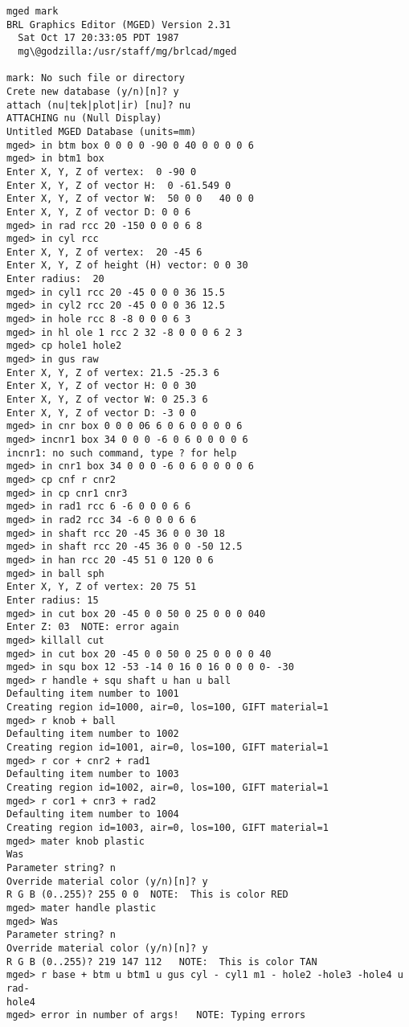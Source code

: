 \begin{verbatim}
mged mark
BRL Graphics Editor (MGED) Version 2.31
  Sat Oct 17 20:33:05 PDT 1987
  mg\@godzilla:/usr/staff/mg/brlcad/mged

mark: No such file or directory
Crete new database (y/n)[n]? y
attach (nu|tek|plot|ir) [nu]? nu
ATTACHING nu (Null Display)
Untitled MGED Database (units=mm)
mged> in btm box 0 0 0 0 -90 0 40 0 0 0 0 6
mged> in btm1 box
Enter X, Y, Z of vertex:  0 -90 0
Enter X, Y, Z of vector H:  0 -61.549 0
Enter X, Y, Z of vector W:  50 0 0   40 0 0
Enter X, Y, Z of vector D: 0 0 6
mged> in rad rcc 20 -150 0 0 0 6 8
mged> in cyl rcc
Enter X, Y, Z of vertex:  20 -45 6
Enter X, Y, Z of height (H) vector: 0 0 30
Enter radius:  20
mged> in cyl1 rcc 20 -45 0 0 0 36 15.5
mged> in cyl2 rcc 20 -45 0 0 0 36 12.5
mged> in hole rcc 8 -8 0 0 0 6 3
mged> in hl ole 1 rcc 2 32 -8 0 0 0 6 2 3
mged> cp hole1 hole2
mged> in gus raw
Enter X, Y, Z of vertex: 21.5 -25.3 6
Enter X, Y, Z of vector H: 0 0 30
Enter X, Y, Z of vector W: 0 25.3 6
Enter X, Y, Z of vector D: -3 0 0
mged> in cnr box 0 0 0 06 6 0 6 0 0 0 0 6
mged> incnr1 box 34 0 0 0 -6 0 6 0 0 0 0 6
incnr1: no such command, type ? for help
mged> in cnr1 box 34 0 0 0 -6 0 6 0 0 0 0 6
mged> cp cnf r cnr2
mged> in cp cnr1 cnr3
mged> in rad1 rcc 6 -6 0 0 0 6 6
mged> in rad2 rcc 34 -6 0 0 0 6 6
mged> in shaft rcc 20 -45 36 0 0 30 18
mged> in shaft rcc 20 -45 36 0 0 -50 12.5
mged> in han rcc 20 -45 51 0 120 0 6
mged> in ball sph
Enter X, Y, Z of vertex: 20 75 51
Enter radius: 15
mged> in cut box 20 -45 0 0 50 0 25 0 0 0 040
Enter Z: 03  NOTE: error again
mged> killall cut
mged> in cut box 20 -45 0 0 50 0 25 0 0 0 0 40
mged> in squ box 12 -53 -14 0 16 0 16 0 0 0 0- -30
mged> r handle + squ shaft u han u ball
Defaulting item number to 1001
Creating region id=1000, air=0, los=100, GIFT material=1
mged> r knob + ball
Defaulting item number to 1002
Creating region id=1001, air=0, los=100, GIFT material=1
mged> r cor + cnr2 + rad1
Defaulting item number to 1003
Creating region id=1002, air=0, los=100, GIFT material=1
mged> r cor1 + cnr3 + rad2
Defaulting item number to 1004
Creating region id=1003, air=0, los=100, GIFT material=1
mged> mater knob plastic
Was
Parameter string? n
Override material color (y/n)[n]? y
R G B (0..255)? 255 0 0  NOTE:  This is color RED
mged> mater handle plastic
mged> Was
Parameter string? n
Override material color (y/n)[n]? y
R G B (0..255)? 219 147 112   NOTE:  This is color TAN
mged> r base + btm u btm1 u gus cyl - cyl1 m1 - hole2 -hole3 -hole4 u rad-
hole4
mged> error in number of args!   NOTE: Typing errors

\end{verbatim}
